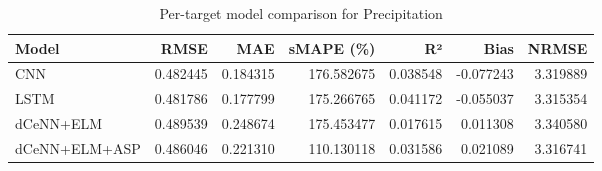 \begin{table}
\caption{Per-target model comparison for Precipitation}
\begin{tabular}{lrrrrrr}
\toprule
Model & RMSE & MAE & sMAPE (\%) & R² & Bias & NRMSE \\
\midrule
CNN & 0.482445 & 0.184315 & 176.582675 & 0.038548 & -0.077243 & 3.319889 \\
LSTM & 0.481786 & 0.177799 & 175.266765 & 0.041172 & -0.055037 & 3.315354 \\
dCeNN+ELM & 0.489539 & 0.248674 & 175.453477 & 0.017615 & 0.011308 & 3.340580 \\
dCeNN+ELM+ASP & 0.486046 & 0.221310 & 110.130118 & 0.031586 & 0.021089 & 3.316741 \\
\bottomrule
\end{tabular}
\end{table}
